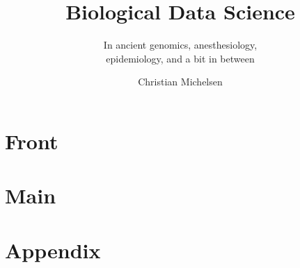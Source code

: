 \documentclass[
    11pt,
	colorful,
	boxey,
]{tufte-style-thesis}
\author{Christian Michelsen}
\title{Biological Data Science}
\subtitle{In ancient genomics, anesthesiology, \\epidemiology, and a bit in between}
\begin{document}
\maketitle

\tableofcontents

\frontmatter
\part*{Front}







\mainmatter
\part*{Main}



% 
% 
% 
% 


\part*{Appendix}
\appendix


\backmatter
% 
\end{document}
